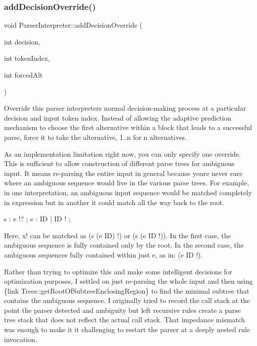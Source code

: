 \subsubsection{\texorpdfstring{add\+Decision\+Override()}{addDecisionOverride()}}
{\footnotesize\ttfamily void Parser\+Interpreter\+::add\+Decision\+Override (\begin{DoxyParamCaption}\item[{int}]{decision,  }\item[{int}]{token\+Index,  }\item[{int}]{forced\+Alt }\end{DoxyParamCaption})}

Override this parser interpreters normal decision-\/making process at a particular decision and input token index. Instead of allowing the adaptive prediction mechanism to choose the first alternative within a block that leads to a successful parse, force it to take the alternative, 1..n for n alternatives.

As an implementation limitation right now, you can only specify one override. This is sufficient to allow construction of different parse trees for ambiguous input. It means re-\/parsing the entire input in general because you\textquotesingle{}re never sure where an ambiguous sequence would live in the various parse trees. For example, in one interpretation, an ambiguous input sequence would be matched completely in expression but in another it could match all the way back to the root.

s \+: e \textquotesingle{}!\textquotesingle{}? ; e \+: ID $\vert$ ID \textquotesingle{}!\textquotesingle{} ;

Here, x! can be matched as (s (e ID) !) or (s (e ID !)). In the first case, the ambiguous sequence is fully contained only by the root. In the second case, the ambiguous sequences fully contained within just e, as in\+: (e ID !).

Rather than trying to optimize this and make some intelligent decisions for optimization purposes, I settled on just re-\/parsing the whole input and then using \{link Trees\+::get\+Root\+Of\+Subtree\+Enclosing\+Region\} to find the minimal subtree that contains the ambiguous sequence. I originally tried to record the call stack at the point the parser detected and ambiguity but left recursive rules create a parse tree stack that does not reflect the actual call stack. That impedance mismatch was enough to make it it challenging to restart the parser at a deeply nested rule invocation.


